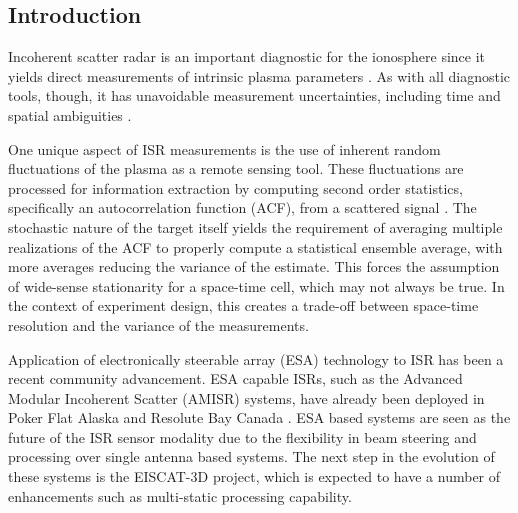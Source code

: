 \documentclass[draft,ras]{agutex}
\begin{document}
%
%

%

\begin{article}

\section{Introduction}
Incoherent scatter radar is an important diagnostic for the ionosphere since it yields direct measurements of intrinsic plasma parameters  \citep{dougherty:farley1960, farleydougherty:ISR2, doughteryfarley:ISR3, hagfors1961}. As with all diagnostic tools, though, it has unavoidable measurement uncertainties, including time and spatial ambiguities \citep{farley1969,farleycomppower1969,Woodman:1991is,hysell2008,RDS:RDS20236}.  

One unique aspect of ISR measurements is the use of inherent random fluctuations of the plasma as a remote sensing tool. These fluctuations are processed for information extraction by computing second order statistics, specifically an autocorrelation function (ACF), from a scattered signal \citep{farley1969}. The stochastic nature of the target itself yields the requirement of averaging multiple realizations of the ACF to properly compute a statistical ensemble average, with more averages reducing the variance of the estimate. This forces the assumption of wide-sense stationarity for a space-time cell, which may not always be true. In the context of experiment design, this creates a trade-off between space-time resolution and the variance of the measurements.

Application of electronically steerable array (ESA) technology to ISR has been a recent community advancement. ESA capable ISRs, such as the Advanced Modular Incoherent Scatter (AMISR) systems, have already been deployed in Poker Flat Alaska and Resolute Bay Canada \citep{Nicolls:2007ie, dahlgren2012di}. ESA based systems are seen as the future of the ISR sensor modality due to the flexibility in beam steering and processing over single antenna based systems. The next step in the evolution of these systems is the EISCAT-3D project, which is expected to have a number of enhancements such as multi-static processing capability.


\end{article}
\end{document}

